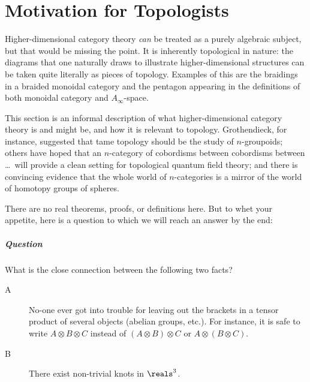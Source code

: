 
\chapter{Motivation for Topologists}




\noindent
Higher-dimensional category theory \emph{can} be treated as a purely
algebraic subject, but that would be missing the point.  It is inherently
topological in nature: the diagrams that one naturally draws to illustrate
higher-dimensional structures can be taken quite literally as pieces of
topology.  Examples of this are the braidings in a braided%
%
%
monoidal
category and the pentagon%
%
%
appearing in the definitions of both monoidal
category and $A_\infty$-space.%
%
%

This section is an informal description of what higher-dimensional category
theory is and might be, and how it is relevant to topology.  Grothendieck,
for instance, suggested that tame topology should be the study of
$n$-groupoids;%
%
%
others have hoped that an $n$-category of cobordisms between cobordisms
between \ldots\ will provide a clean setting for topological quantum field
theory; and there is convincing evidence that the whole world of
$n$-categories is a mirror of the world of homotopy groups of spheres.

There are no real theorems, proofs, or definitions here.  But to whet your
appetite, here is a question to which we will reach an answer by the end:

\paragraph*{Question} What is the close connection between the following two
facts? 
%
\begin{description}
\item[A] No-one ever got into trouble for leaving out the brackets in a
tensor product of several objects (abelian groups, etc.).  For instance, it
is safe to write $A\otimes B\otimes C$ instead of $(A\otimes B)\otimes C$
or $A\otimes (B\otimes C)$.%
%
%

\item[B] There exist non-trivial knots%
%
%
in $\reals^3$.
\end{description}


